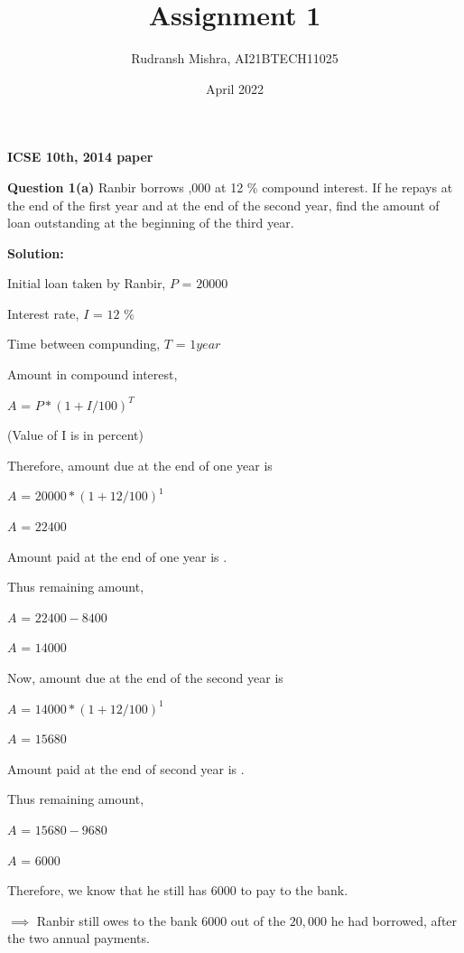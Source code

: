 \documentclass[article,12pt,twocolumn]{IEEEtran}
\begin{document}
 

\title{Assignment 1}
\author{Rudransh Mishra, AI21BTECH11025}
\date{April 2022}
\maketitle

\textbf{ICSE 10th, 2014 paper}


\hfill

\textbf{Question 1(a)} 
Ranbir borrows ,000 at 12 \% compound interest. If he repays  at the end of the first year and  at the end of the second year, find the amount of loan outstanding at the beginning of the third year.

\hfill \break
\textbf{Solution:}

Initial loan taken by Ranbir, $P$ = \rupee $20000$

Interest rate, $I$ = $12 $ $\%$

Time between compunding, $T$ = $1 year $

\hfill

Amount in compound interest, 

\hfill

$A$ = $ P * (1+I/100)^T $ 

\hfill

(Value of I is in percent)

\hfill

Therefore, amount due at the end of one year is 

\hfill

$A$ = $20000 * (1+12/100)^1 $

$A$ = \rupee $22400$

\hfill

Amount paid at the end of one year is .

Thus remaining amount,

\hfill

$A$ = $22400-8400$

$A$ = \rupee $14000$

\hfill

Now, amount due at the end of the second year is 

\hfill

$A$ = $14000 * (1+12/100)^1 $

$A$ = \rupee $15680$

\hfill

Amount paid at the end of second year is .


Thus remaining amount,

\hfill

$A$ = $15680-9680$

$A$ = \rupee $6000$

\hfill

\hfill

\hfill

\hfill

Therefore, we know that he still has \rupee $6000$ to pay to the bank.

\hfill

$\implies$ Ranbir still owes to the bank \rupee $6000$ out of the \rupee $20,000$ he had borrowed, after the two annual payments.
\end{document}
